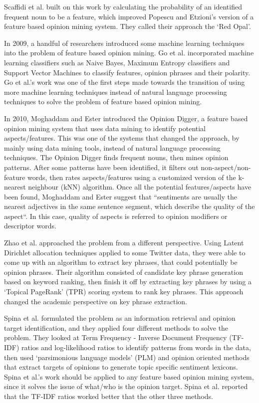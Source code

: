 \documentclass{sig-alternate}
\begin{document}
Scaffidi et al.\cite{ScaffidiBierhoffChangFelkerNgJin2007} built on this work by calculating the probability of an identified frequent noun to be a feature, which improved Popescu and Etzioni's version of a feature based opinion mining system. They called their approach the `Red Opal'. 

In 2009, a handful of researchers introduced some machine learning techniques into the problem of feature based opinion mining. Go et al.\cite{GoBhayaniHuang2009} incorporated machine learning classifiers such as Naive Bayes, Maximum Entropy classifiers and Support Vector Machines to classify features, opinion phrases and their polarity. Go et al.'s work\cite{GoBhayaniHuang2009} was one of the first steps made towards the transition of using more machine learning techniques instead of natural language processing techniques to solve the problem of feature based opinion mining.

In 2010, Moghaddam and Ester\cite{MoghaddamEster2010} introduced the Opinion Digger, a feature based opinion mining system that uses data mining to identify potential aspects/features. This was one of the systems that changed the approach, by mainly using data mining tools, instead of natural language processing techniques. The Opinion Digger finds frequent nouns, then mines opinion patterns. After some patterns have been identified, it filters out non-aspect/non-feature words, then rates aspects/features using a customized version of the k-nearest neighbour (kNN) algorithm. Once all the potential features/aspects have been found, Moghaddam and Ester suggest that ``sentiments are usually the nearest adjectives in the same sentence segment, which describe the quality of the aspect``\cite{MoghaddamEster2010}. In this case, quality of aspects is referred to opinion modifiers or descriptor words.

Zhao et al.\cite{ZhaoJiangHeSongAchananuparpLimLi2011} approached the problem from a different perspective. Using Latent Dirichlet allocation techniques applied to some Twitter data, they were able to come up with an algorithm to extract key phrases, that could potentially be opinion phrases. Their algorithm consisted of candidate key phrase generation based on keyword ranking, then finish it off by extracting key phrases by using a `Topical PageRank' (TPR) scoring system to rank key phrases. This approach changed the academic perspective on key phrase extraction.

Spina et al.\cite{SpinaMeijDeRijkeOghinaBuiBreuss2012} formulated the problem as an information retrieval and opinion target identification, and they applied four different methods to solve the problem. They looked at Term Frequency - Inverse Document Frequency (TF-IDF) ratios and log-likelihood ratios to identify patterns from words in the data, then used `parsimonious language models' (PLM) and opinion oriented methods that extract targets of opinions to generate topic specific sentiment lexicons. Spina et al.'s work should be applied to any feature based opinion mining system, since it solves the issue of what/who is the opinion target. Spina et al. reported that the TF-IDF ratios worked better that the other three methods.
\end{document}
